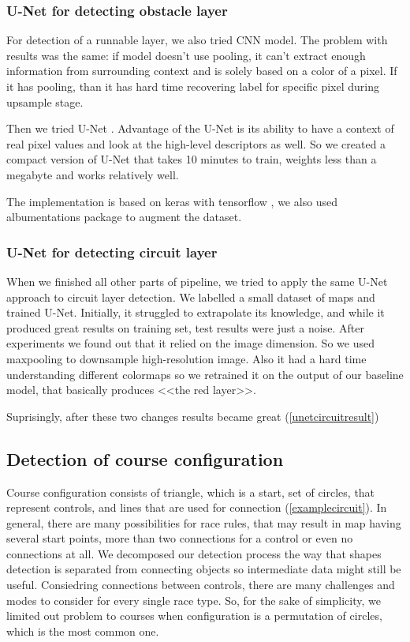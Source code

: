 \documentclass[a4paper,12pt]{extarticle}
\begin{document}
\subsubsection{U-Net for detecting obstacle layer}

For detection of a runnable layer, we also tried CNN model.
The problem with results was the same: if model doesn't use pooling, it can't extract enough information from surrounding context and is solely based on a color of a pixel.
If it has pooling, than it has hard time recovering label for specific pixel during upsample stage.

Then we tried U-Net \cite{unet}. Advantage of the U-Net is its ability to have a context of real pixel values and look at the high-level descriptors as well.
So we created a compact version of U-Net that takes 10 minutes to train, weights less than a megabyte and works relatively well.

The implementation is based on keras with tensorflow \cite{keras}, we also used albumentations \cite{albumentations} package to augment the dataset.

\subsubsection{U-Net for detecting circuit layer}

When we finished all other parts of pipeline, we tried to apply the same U-Net approach to circuit layer detection.
We labelled a small dataset of maps and trained U-Net.
Initially, it struggled to extrapolate its knowledge, and while it produced great results on training set, test results were just a noise.
After experiments we found out that it relied on the image dimension. So we used maxpooling to downsample high-resolution image.
Also it had a hard time understanding different colormaps so we retrained it on the output of our baseline model, that basically produces <<the red layer>>. 

Suprisingly, after these two changes results became great (\cref{unetcircuitresult})

\subsection{Detection of course configuration}

Course configuration consists of triangle, which is a start, set of circles, that represent controls, and lines that are used for connection (\cref{examplecircuit}).
In general, there are many possibilities for race rules, that may result in map having several start points, more than two connections for a control or even no connections at all.
We decomposed our detection process the way that shapes detection is separated from connecting objects so intermediate data might still be useful.
Consiedring connections between controls, there are many challenges and modes to consider for every single race type.
So, for the sake of simplicity, we limited out problem to courses when  configuration is a permutation of circles, which is the most common one.
\end{document}
